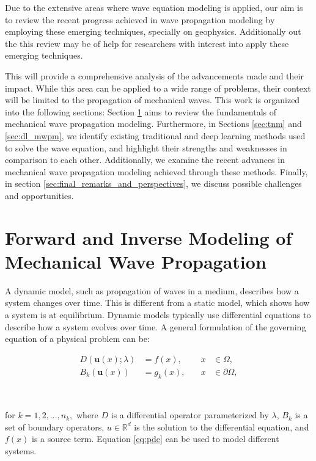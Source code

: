 \documentclass{tufte-handout}
\begin{document}
Due to the extensive areas where wave equation modeling is applied, our aim is to review the recent progress achieved in wave propagation modeling by employing these emerging techniques, specially on geophysics. Additionally out the this review may be of help for researchers with interest into apply these emerging techniques.

This will provide a comprehensive analysis of the advancements made and their impact. While this area can be applied to a wide range of problems, their context will be limited to the propagation of mechanical waves. This work is organized into the following sections: Section \ref{sec:fordward_inverse_modeling_mechanical_waves} aims to review the fundamentals of mechanical wave propagation modeling. Furthermore, in Sections \ref{sec:tnm} and \ref{sec:dl_mwpm}, we identify existing traditional and deep learning methods used to solve the wave equation, and highlight their strengths and weaknesses in comparison to each other. Additionally, we examine the recent advances in mechanical wave propagation modeling achieved through these methods. Finally, in section \ref{sec:final_remarks_and_perspectives}, we discuss possible challenges and opportunities.

\section{Forward and Inverse Modeling of Mechanical Wave Propagation}\label{sec:fordward_inverse_modeling_mechanical_waves}
 
 
A dynamic model, such as propagation of waves in a medium, describes how a system changes over time. This is different from a static model, which shows how a system is at equilibrium. Dynamic models typically use differential equations to describe how a system evolves over time. A general formulation of the governing equation of a physical problem can be:

\begin{equation}
\begin{aligned}
D(\boldsymbol{u}(x); \lambda) &= f(x), & \quad x &\in \Omega,\\\label{eq:pde}
B_k(\boldsymbol{u}(x)) &= g_k(x), & \quad x &\in  \partial\Omega,
\end{aligned}
\end{equation}

\

for $k = 1, 2, ..., n_k,$ where $D$ is a differential operator parameterized by $\lambda$, $B_k$ is a set of boundary operators, $u \in \mathbb{R}^{d}$ is the solution to the differential equation, and $f(x)$ is a source term. Equation \ref{eq:pde} can be used to model different systems.  
\end{document}
